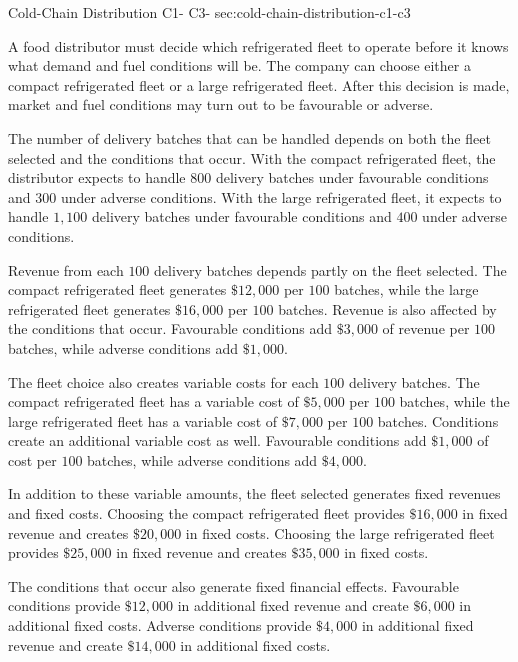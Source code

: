 	\sectionScored
	{Cold-Chain Distribution}
	{C1- \hspace{2mm} C3-}
	{sec:cold-chain-distribution-c1-c3}
	{

	A food distributor must decide which refrigerated fleet to operate before it knows what demand and fuel conditions will be. The company can choose either a compact refrigerated fleet or a large refrigerated fleet. After this decision is made, market and fuel conditions may turn out to be favourable or adverse.

	The number of delivery batches that can be handled depends on both the fleet selected and the conditions that occur. With the compact refrigerated fleet, the distributor expects to handle $800$ delivery batches under favourable conditions and $300$ under adverse conditions. With the large refrigerated fleet, it expects to handle $1{,}100$ delivery batches under favourable conditions and $400$ under adverse conditions.

	Revenue from each $100$ delivery batches depends partly on the fleet selected. The compact refrigerated fleet generates $\$12{,}000$ per $100$ batches, while the large refrigerated fleet generates $\$16{,}000$ per $100$ batches. Revenue is also affected by the conditions that occur. Favourable conditions add $\$3{,}000$ of revenue per $100$ batches, while adverse conditions add $\$1{,}000$.

	The fleet choice also creates variable costs for each $100$ delivery batches. The compact refrigerated fleet has a variable cost of $\$5{,}000$ per $100$ batches, while the large refrigerated fleet has a variable cost of $\$7{,}000$ per $100$ batches. Conditions create an additional variable cost as well. Favourable conditions add $\$1{,}000$ of cost per $100$ batches, while adverse conditions add $\$4{,}000$.

	In addition to these variable amounts, the fleet selected generates fixed revenues and fixed costs. Choosing the compact refrigerated fleet provides $\$16{,}000$ in fixed revenue and creates $\$20{,}000$ in fixed costs. Choosing the large refrigerated fleet provides $\$25{,}000$ in fixed revenue and creates $\$35{,}000$ in fixed costs.

	The conditions that occur also generate fixed financial effects. Favourable conditions provide $\$12{,}000$ in additional fixed revenue and create $\$6{,}000$ in additional fixed costs. Adverse conditions provide $\$4{,}000$ in additional fixed revenue and create $\$14{,}000$ in additional fixed costs.

}
